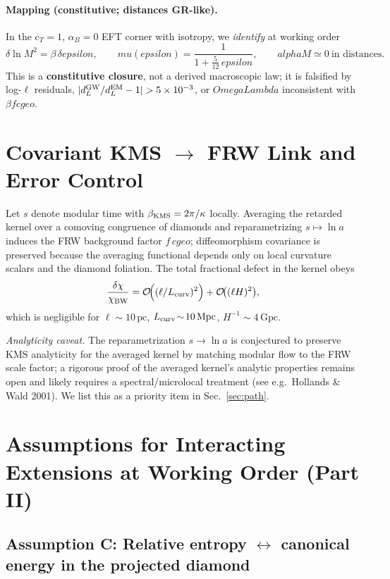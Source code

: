 \documentclass[aps,prd,onecolumn,superscriptaddress,nofootinbib]{revtex4-2}
\def\OmL{OmegaLambda}%
\def\cgeo{cgeo}%
\def\eps{epsilon}%
\def\mu{mu}%
\def\alpha{alpha}%
\def\alpha_M{alphaM}%
\def\Omega_\Lambda{OmegaLambda}%
\providecommand{\OmL}{\Omega_\Lambda}
\providecommand{\cgeo}{c_{\rm geo}}
\providecommand{\eps}{\varepsilon}
\providecommand{\be}{\begin{equation}}
\providecommand{\ee}{\end{equation}}
\begin{document}
\paragraph{Mapping (constitutive; distances GR-like).}
In the c\(_T\!=\!1\), \(\alpha_B\!=\!0\) EFT corner with isotropy, we \emph{identify} at working order
\be
\delta\ln M^2=\beta\,\delta\eps,\qquad
\mu(\eps)=\frac{1}{1+\tfrac{5}{12}\,\eps},\qquad \alpha_M\simeq 0~\text{in distances}.
\label{eq:mapping}
\ee
This is a \textbf{constitutive closure}, not a derived macroscopic law; it is falsified by log-\(\ell\) residuals, \(|d_L^{\rm GW}/d_L^{\rm EM}-1|>5\times 10^{-3}\), or \(\OmL\) inconsistent with \(\beta f\cgeo\).

\section{Covariant KMS \texorpdfstring{$\to$}{->} FRW Link and Error Control}
\label{sec:kms-frw}
Let \(s\) denote modular time with \(\beta_{\rm KMS}=2\pi/\kappa\) locally. Averaging the retarded kernel over a comoving congruence of diamonds and reparametrizing \(s\mapsto \ln a\) induces the FRW background factor \(f\,\cgeo\); diffeomorphism covariance is preserved because the averaging functional depends only on local curvature scalars and the diamond foliation. The total fractional defect in the kernel obeys
\be
\frac{\delta\chi}{\chi_{\rm BW}}=\mathcal O\!\Big((\ell/L_{\rm curv})^2\Big)+\mathcal O\!\big((\ell H)^2\big),
\ee
which is negligible for \(\ell\!\sim\!10\,\mathrm{pc}\), \(L_{\rm curv}\!\sim\!10\,\mathrm{Mpc}\), \(H^{-1}\!\sim\!4\,\mathrm{Gpc}\).

\emph{Analyticity caveat.} The reparametrization \(s\to\ln a\) is conjectured to preserve KMS analyticity for the averaged kernel by matching modular flow to the FRW scale factor; a rigorous proof of the averaged kernel’s analytic properties remains open and likely requires a spectral/microlocal treatment (see e.g.\ Hollands \& Wald 2001). We list this as a priority item in Sec.~\ref{sec:path}.

\section{Assumptions for Interacting Extensions at Working Order (Part II)}
\label{sec:assumptions}

\subsection{Assumption C: Relative entropy \texorpdfstring{$\leftrightarrow$}{<->} canonical energy in the projected diamond}
\label{sec:lemmaC}
\end{document}
